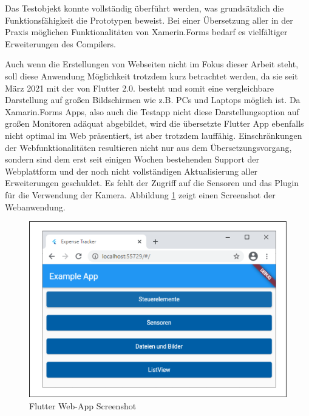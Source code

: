 Das Testobjekt konnte vollständig überführt werden, was grundsätzlich die 
Funktionsfähigkeit die Prototypen beweist. Bei einer Übersetzung aller in der Praxis möglichen 
Funktionalitäten von Xamerin.Forms bedarf es vielfältiger Erweiterungen des Compilers.

 Auch wenn die Erstellungen von Webseiten nicht im Fokus dieser Arbeit steht, soll diese 
Anwendung Möglichkeit trotzdem kurz betrachtet werden, da sie seit März 2021 mit der 
 von Flutter 2.0. besteht und somit eine vergleichbare Darstellung auf 
großen Bildschirmen wie z.B. PCs und Laptops möglich ist. Da Xamarin.Forms Apps, also auch die Testapp nicht diese Darstellungsoption auf großen 
Monitoren adäquat abgebildet, wird die übersetzte Flutter App ebenfalls nicht optimal im Web präsentiert,  ist aber trotzdem 
lauffähig. Einschränkungen der Webfunktionalitäten resultieren nicht nur aus dem Übersetzungsvorgang, 
sondern sind dem erst seit einigen Wochen bestehenden Support der Webplattform und der noch 
nicht vollständigen Aktualisierung aller Erweiterungen geschuldet.  Es fehlt der Zugriff auf die Sensoren und das Plugin für die Verwendung der Kamera.   Abbildung \ref{fig:WebView} zeigt einen Screenshot der Webanwendung.
\begin{figure}[!ht]
 \includegraphics[width=\textwidth,keepaspectratio]{Images/Implementation/WebApp.png}
 \caption{Flutter Web-App Screenshot}
 \label{fig:WebView}
\end{figure}




